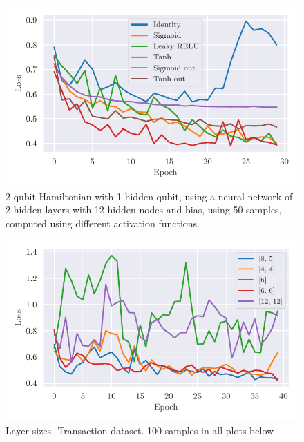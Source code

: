 \documentclass[../main.tex]{subfiles}
\begin{document}
\begin{figure}
    \begin{center}
        \includegraphics{figures/loss_activations_12_2_without_relu.pdf}
        \caption{2 qubit Hamiltonian with 1 hidden qubit, using a neural network of 2 hidden layers with 12 hidden nodes and bias, using 50 samples, computed using different activation functions.}
        \label{fig:3}
    \end{center}
\end{figure}


\begin{figure}
    \begin{center}
        \includegraphics{figures/H2_NNsizes_tr_fraud.pdf}
        \caption{Layer sizes- Transaction dataset. 100 samples in all plots below}
        \label{fig:2}
    \end{center}
\end{figure}
\end{document}
